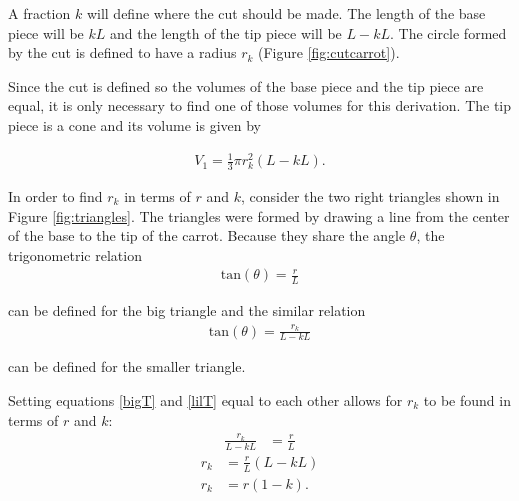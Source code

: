 \documentclass[a4paper, 12pt]{article}
\begin{document}
A fraction $k$ will define where the cut should be made. The length of the base piece will be $kL$ and the length of the tip piece will be $L-kL$. The circle formed by the cut is defined to have a radius $r_k$ (Figure \ref{fig:cutcarrot}). 


Since the cut is defined so the volumes of the base piece and the tip piece are equal, it is only necessary to find one of those volumes for this derivation. The tip piece is a cone and its volume is given by 

	\begin{align}\label{tipVol}
		V_1 = \frac{1}{3}\pi r_k^2 (L-kL).
	\end{align}

In order to find $r_k$ in terms of $r$ and $k$, consider the two right triangles shown in Figure \ref{fig:triangles}. The triangles were formed by drawing a line from the center of the base to the tip of the carrot. Because they share the angle $\theta$, the trigonometric relation
	\begin{align}\label{bigT}
		\text{tan}(\theta) = \frac{r}{L}
	\end{align}

can be defined for the big triangle and the similar relation
	\begin{align}\label{lilT}
		\text{tan}(\theta) = \frac{r_k}{L-kL}
	\end{align}

can be defined for the smaller triangle. 


Setting equations \eqref{bigT} and \eqref{lilT} equal to each other allows for $r_k$ to be found in terms of $r$ and $k$:
	\begin{align*}
		\frac{r_k}{L-kL} &= \frac{r}{L}
	\end{align*}
	\begin{align*}
		r_k &= \frac{r}{L}(L-kL)\nonumber \\
		r_k &= r(1-k).
	\end{align*}
\end{document}
